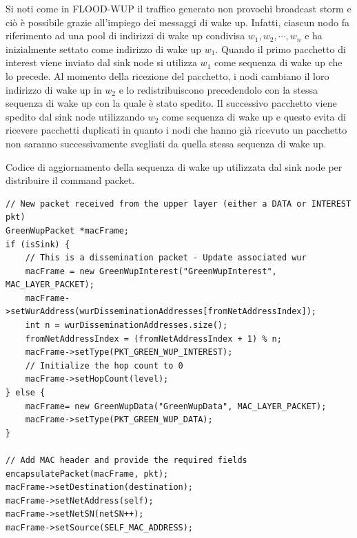 \documentclass[binding=0.6cm,TFA]{sapthesis}
\begin{document}
Si noti come in FLOOD-WUP il traffico generato non provochi broadcast storm e ciò è possibile grazie all'impiego dei messaggi
di wake up. Infatti, ciascun nodo fa riferimento ad una pool di indirizzi di wake up condivisa $w_1, w_2, \cdots, w_n$ e ha inizialmente
settato come indirizzo di wake up $w_1$. Quando il primo pacchetto di interest viene inviato dal sink node si utilizza $w_1$ come sequenza
di wake up che lo precede. Al momento della ricezione del pacchetto, i nodi cambiano il loro indirizzo di wake up in $w_2$ e lo redistribuiscono
precedendolo con la stessa sequenza di wake up con la quale è stato spedito. Il successivo pacchetto viene spedito dal sink
node utilizzando $w_2$ come sequenza di wake up e questo evita di ricevere pacchetti duplicati in quanto i nodi che hanno già ricevuto un
pacchetto non saranno successivamente svegliati da quella stessa sequenza di wake up.\\

\begin{listing}
    \caption{Codice di aggiornamento della sequenza di wake up utilizzata dal sink node per distribuire il command packet.}
    \begin{verbatim}
// New packet received from the upper layer (either a DATA or INTEREST pkt)
GreenWupPacket *macFrame;
if (isSink) {
    // This is a dissemination packet - Update associated wur
    macFrame = new GreenWupInterest("GreenWupInterest", MAC_LAYER_PACKET);
    macFrame->setWurAddress(wurDisseminationAddresses[fromNetAddressIndex]);
    int n = wurDisseminationAddresses.size();
    fromNetAddressIndex = (fromNetAddressIndex + 1) % n;
    macFrame->setType(PKT_GREEN_WUP_INTEREST);
    // Initialize the hop count to 0
    macFrame->setHopCount(level);
} else {
    macFrame= new GreenWupData("GreenWupData", MAC_LAYER_PACKET);
    macFrame->setType(PKT_GREEN_WUP_DATA);
}

// Add MAC header and provide the required fields
encapsulatePacket(macFrame, pkt);
macFrame->setDestination(destination);
macFrame->setNetAddress(self);
macFrame->setNetSN(netSN++);
macFrame->setSource(SELF_MAC_ADDRESS);

    \end{verbatim}
\end{listing}
\end{document}
